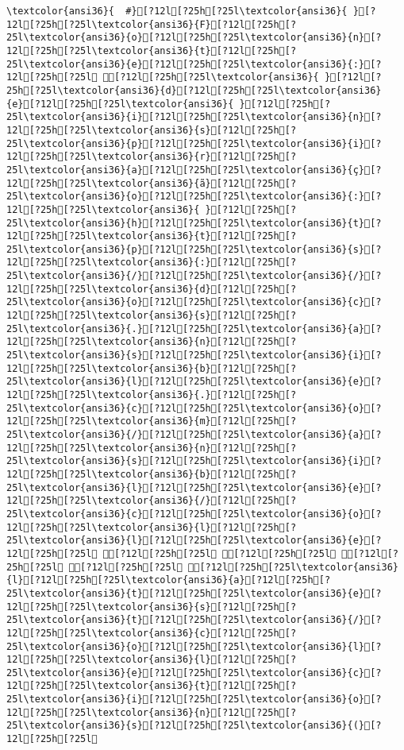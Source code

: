 \documentclass{scrartcl}
\begin{document}
\begin{Verbatim}
\textcolor{ansi36}{  #}[?12l[?25h[?25l\textcolor{ansi36}{ }[?12l[?25h[?25l\textcolor{ansi36}{F}[?12l[?25h[?25l\textcolor{ansi36}{o}[?12l[?25h[?25l\textcolor{ansi36}{n}[?12l[?25h[?25l\textcolor{ansi36}{t}[?12l[?25h[?25l\textcolor{ansi36}{e}[?12l[?25h[?25l\textcolor{ansi36}{:}[?12l[?25h[?25l [?12l[?25h[?25l\textcolor{ansi36}{ }[?12l[?25h[?25l\textcolor{ansi36}{d}[?12l[?25h[?25l\textcolor{ansi36}{e}[?12l[?25h[?25l\textcolor{ansi36}{ }[?12l[?25h[?25l\textcolor{ansi36}{i}[?12l[?25h[?25l\textcolor{ansi36}{n}[?12l[?25h[?25l\textcolor{ansi36}{s}[?12l[?25h[?25l\textcolor{ansi36}{p}[?12l[?25h[?25l\textcolor{ansi36}{i}[?12l[?25h[?25l\textcolor{ansi36}{r}[?12l[?25h[?25l\textcolor{ansi36}{a}[?12l[?25h[?25l\textcolor{ansi36}{ç}[?12l[?25h[?25l\textcolor{ansi36}{ã}[?12l[?25h[?25l\textcolor{ansi36}{o}[?12l[?25h[?25l\textcolor{ansi36}{:}[?12l[?25h[?25l\textcolor{ansi36}{ }[?12l[?25h[?25l\textcolor{ansi36}{h}[?12l[?25h[?25l\textcolor{ansi36}{t}[?12l[?25h[?25l\textcolor{ansi36}{t}[?12l[?25h[?25l\textcolor{ansi36}{p}[?12l[?25h[?25l\textcolor{ansi36}{s}[?12l[?25h[?25l\textcolor{ansi36}{:}[?12l[?25h[?25l\textcolor{ansi36}{/}[?12l[?25h[?25l\textcolor{ansi36}{/}[?12l[?25h[?25l\textcolor{ansi36}{d}[?12l[?25h[?25l\textcolor{ansi36}{o}[?12l[?25h[?25l\textcolor{ansi36}{c}[?12l[?25h[?25l\textcolor{ansi36}{s}[?12l[?25h[?25l\textcolor{ansi36}{.}[?12l[?25h[?25l\textcolor{ansi36}{a}[?12l[?25h[?25l\textcolor{ansi36}{n}[?12l[?25h[?25l\textcolor{ansi36}{s}[?12l[?25h[?25l\textcolor{ansi36}{i}[?12l[?25h[?25l\textcolor{ansi36}{b}[?12l[?25h[?25l\textcolor{ansi36}{l}[?12l[?25h[?25l\textcolor{ansi36}{e}[?12l[?25h[?25l\textcolor{ansi36}{.}[?12l[?25h[?25l\textcolor{ansi36}{c}[?12l[?25h[?25l\textcolor{ansi36}{o}[?12l[?25h[?25l\textcolor{ansi36}{m}[?12l[?25h[?25l\textcolor{ansi36}{/}[?12l[?25h[?25l\textcolor{ansi36}{a}[?12l[?25h[?25l\textcolor{ansi36}{n}[?12l[?25h[?25l\textcolor{ansi36}{s}[?12l[?25h[?25l\textcolor{ansi36}{i}[?12l[?25h[?25l\textcolor{ansi36}{b}[?12l[?25h[?25l\textcolor{ansi36}{l}[?12l[?25h[?25l\textcolor{ansi36}{e}[?12l[?25h[?25l\textcolor{ansi36}{/}[?12l[?25h[?25l\textcolor{ansi36}{c}[?12l[?25h[?25l\textcolor{ansi36}{o}[?12l[?25h[?25l\textcolor{ansi36}{l}[?12l[?25h[?25l\textcolor{ansi36}{l}[?12l[?25h[?25l\textcolor{ansi36}{e}[?12l[?25h[?25l [?12l[?25h[?25l [?12l[?25h[?25l [?12l[?25h[?25l [?12l[?25h[?25l [?12l[?25h[?25l\textcolor{ansi36}{l}[?12l[?25h[?25l\textcolor{ansi36}{a}[?12l[?25h[?25l\textcolor{ansi36}{t}[?12l[?25h[?25l\textcolor{ansi36}{e}[?12l[?25h[?25l\textcolor{ansi36}{s}[?12l[?25h[?25l\textcolor{ansi36}{t}[?12l[?25h[?25l\textcolor{ansi36}{/}[?12l[?25h[?25l\textcolor{ansi36}{c}[?12l[?25h[?25l\textcolor{ansi36}{o}[?12l[?25h[?25l\textcolor{ansi36}{l}[?12l[?25h[?25l\textcolor{ansi36}{l}[?12l[?25h[?25l\textcolor{ansi36}{e}[?12l[?25h[?25l\textcolor{ansi36}{c}[?12l[?25h[?25l\textcolor{ansi36}{t}[?12l[?25h[?25l\textcolor{ansi36}{i}[?12l[?25h[?25l\textcolor{ansi36}{o}[?12l[?25h[?25l\textcolor{ansi36}{n}[?12l[?25h[?25l\textcolor{ansi36}{s}[?12l[?25h[?25l\textcolor{ansi36}{(}[?12l[?25h[?25l 
\end{Verbatim}
\end{document}
